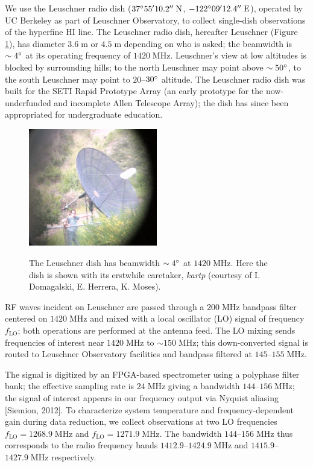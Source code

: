 \documentclass[10pt]{article}
\newcommand {\mt}{\mathrm}
\newcommand {\unit}[1]{\; \mt{#1}}
\begin{document}
We use the Leuschner radio dish ($37\degree 55' 10.2'' \unit{N}$, $-122\degree 09' 12.4'' \unit{E}$), operated by UC Berkeley as part of Leuschner Observatory, to collect single-dish observations of the hyperfine HI line.  The Leuschner radio dish, hereafter Leuschner (Figure \ref{fig:kartp}), has diameter $3.6\unit{m}$ or $4.5\unit{m}$ depending on who is asked; the beamwidth is $\sim4\degree$ at its operating frequency of $1420 \unit{MHz}$.  Leuschner's view at low altitudes is blocked by surrounding hills; to the north Leuschner may point above $\sim50\degree$, to the south Leuschner may point to $20$--$30\degree$ altitude.  The Leuschner radio dish was built for the SETI Rapid Prototype Array (an early prototype for the now-underfunded and incomplete Allen Telescope Array); the dish has since been appropriated for undergraduate education.

\begin{figure}[!ht]
    \centering
    \includegraphics[width=0.5\textwidth]{kartp.png} \\
    \caption{The Leuschner dish has beamwidth $\sim 4 \degree$ at $1420 \unit{MHz}$.  Here the dish is shown with its erstwhile caretaker, \emph{kartp} (courtesy of I. Domagalski, E. Herrera, K. Moses).}
    \label{fig:kartp}
\end{figure}

RF waves incident on Leuschner are passed through a $200 \unit{MHz}$ bandpass filter centered on $1420 \unit{MHz}$ and mixed with a local oscillator (LO) signal of frequency $f_{\mt{LO}}$; both operations are performed at the antenna feed.  The LO mixing sends frequencies of interest near $1420 \unit{MHz}$ to $\sim150 \unit{MHz}$; this down-converted signal is routed to Leuschner Observatory facilities and bandpass filtered at $145$--$155 \unit{MHz}$.

The signal is digitized by an FPGA-based spectrometer using a polyphase filter bank; the effective sampling rate is $24 \unit{MHz}$ giving a bandwidth $144$--$156 \unit{MHz}$; the signal of interest appears in our frequency output via Nyquist aliasing [Siemion, 2012].  To characterize system temperature and frequency-dependent gain during data reduction, we collect observations at two LO frequencies $f_{\mt{LO}} = 1268.9 \unit{MHz}$ and $f_{\mt{LO}} = 1271.9 \unit{MHz}$.  The bandwidth $144$--$156 \unit{MHz}$ thus corresponds to the radio frequency bands $1412.9$--$1424.9 \unit{MHz}$ and $1415.9$--$1427.9 \unit{MHz}$ respectively.
\end{document}
